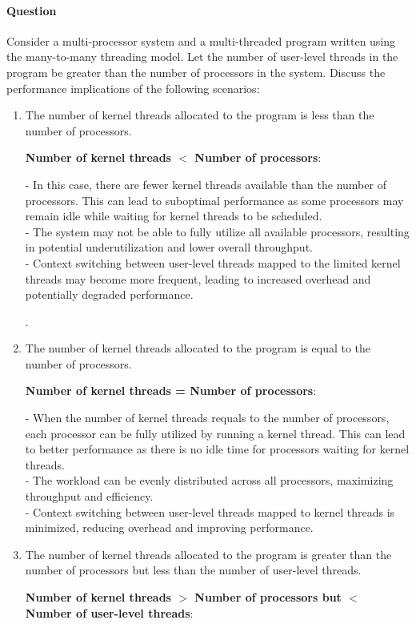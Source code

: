 \documentclass[a4paper,12pt,fleqn]{article}
\newcounter{question}
\newcommand*\question{%
\stepcounter{question}%
\paragraph{Question \thequestion}}
\begin{document}
\question 
{
 Consider a multi-processor system and a multi-threaded program written using the many-to-many
threading model. Let the number of user-level threads in the program be greater than the number of
processors in the system.
Discuss the performance implications of the following scenarios:
}
\begin{enumerate}

\item
{
 The number of kernel threads allocated to the program is less than the number of processors.
}
\begin{answer}
{
 \textbf{Number of kernel threads ${<}$ Number of processors}:
 
- In this case, there are fewer kernel threads available than the number of processors. This can lead to suboptimal performance as some processors may remain idle while waiting for kernel threads to be scheduled.\\
- The system may not be able to fully utilize all available processors, resulting in potential underutilization and lower overall throughput.\\
- Context switching between user-level threads mapped to the limited kernel threads may become more frequent, leading to increased overhead and potentially degraded performance.\\
}.
\end{answer}

\item
{
 The number of kernel threads allocated to the program is equal to the number of processors.
}
\begin{answer}
{
 \textbf{Number of kernel threads = Number of processors}:
 
- When the number of kernel threads requals to the number of processors, each processor can be fully utilized by running a kernel thread. This can lead to better performance as there is no idle time for processors waiting for kernel threads.\\
- The workload can be evenly distributed across all processors, maximizing throughput and efficiency.\\
- Context switching between user-level threads mapped to kernel threads is minimized, reducing overhead and improving performance.

}
\end{answer}

\item
{
The number of kernel threads allocated to the program is greater than the number of processors
but less than the number of user-level threads.
}
\begin{answer}
{
 \textbf{Number of kernel threads ${>}$ Number of processors but ${<}$ Number of user-level threads}:
 
}
\end{answer}
\end{enumerate}
\end{document}
